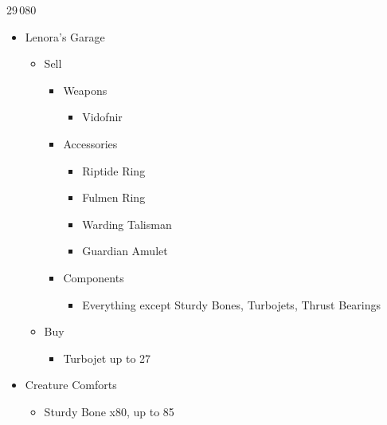 	\begin{shop}{29\,080}
		\begin{itemize}
			\item Lenora's Garage
			      \begin{itemize}
				      \item Sell
				            \begin{itemize}
					            \item Weapons
					                  \begin{itemize}
						                  \item Vidofnir
					                  \end{itemize}
					            \item Accessories
					                  \begin{itemize}
						                  \item Riptide Ring
						                  \item Fulmen Ring
						                  \item Warding Talisman
						                  \item Guardian Amulet
					                  \end{itemize}
					            \item Components
					                  \begin{itemize}
						                  \item Everything except Sturdy Bones, Turbojets, Thrust Bearings
					                  \end{itemize}
				            \end{itemize}
				      \item Buy
				            \begin{itemize}
					            \item Turbojet up to 27
				            \end{itemize}
			      \end{itemize}
			\item Creature Comforts
			      \begin{itemize}
				      \item Sturdy Bone x80, up to 85
			      \end{itemize}
		\end{itemize}
	\end{shop}
	

